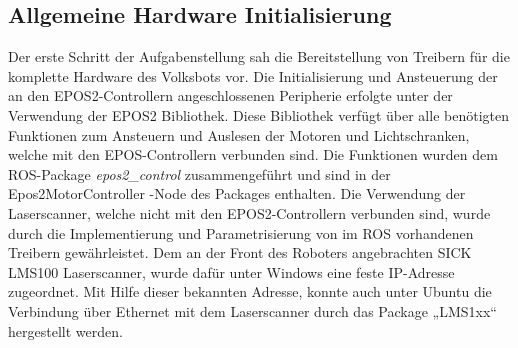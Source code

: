 \subsection{Allgemeine Hardware Initialisierung}

Der erste Schritt der Aufgabenstellung sah die Bereitstellung von Treibern für die komplette Hardware des Volksbots vor. Die Initialisierung und Ansteuerung der an den EPOS2-Controllern angeschlossenen Peripherie erfolgte unter der Verwendung der EPOS2 Bibliothek. Diese Bibliothek verfügt über alle benötigten Funktionen zum Ansteuern und Auslesen der Motoren und Lichtschranken, welche mit den EPOS-Controllern verbunden sind. Die Funktionen wurden dem ROS-Package \textit{epos2\_control} zusammengeführt und sind in der Epos2MotorController 	-Node des Packages enthalten. 
Die Verwendung der Laserscanner, welche nicht mit den EPOS2-Controllern verbunden sind, wurde durch die Implementierung und Parametrisierung von im ROS vorhandenen Treibern gewährleistet. Dem an der Front des Roboters angebrachten SICK LMS100 Laserscanner, wurde dafür unter Windows eine feste IP-Adresse zugeordnet. Mit Hilfe dieser bekannten Adresse, konnte auch unter Ubuntu die Verbindung über Ethernet mit dem Laserscanner durch das Package „LMS1xx“  hergestellt werden.


